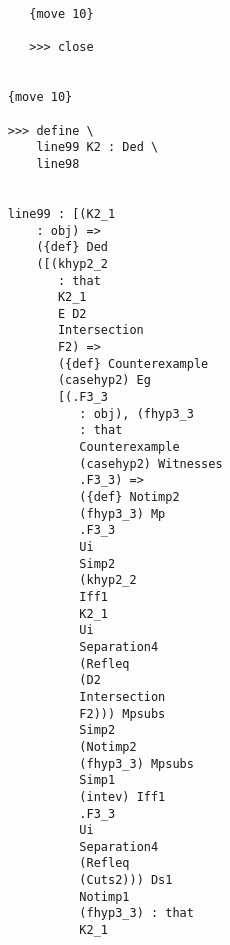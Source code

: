 \documentclass[12pt]{article}
\begin{document}
\begin{verbatim}
                                 {move 10}

                                 >>> close


                              {move 10}

                              >>> define \
                                  line99 K2 : Ded \
                                  line98


                              line99 : [(K2_1 
                                  : obj) => 
                                  ({def} Ded 
                                  ([(khyp2_2 
                                     : that 
                                     K2_1 
                                     E D2 
                                     Intersection 
                                     F2) => 
                                     ({def} Counterexample 
                                     (casehyp2) Eg 
                                     [(.F3_3 
                                        : obj), (fhyp3_3 
                                        : that 
                                        Counterexample 
                                        (casehyp2) Witnesses 
                                        .F3_3) => 
                                        ({def} Notimp2 
                                        (fhyp3_3) Mp 
                                        .F3_3 
                                        Ui 
                                        Simp2 
                                        (khyp2_2 
                                        Iff1 
                                        K2_1 
                                        Ui 
                                        Separation4 
                                        (Refleq 
                                        (D2 
                                        Intersection 
                                        F2))) Mpsubs 
                                        Simp2 
                                        (Notimp2 
                                        (fhyp3_3) Mpsubs 
                                        Simp1 
                                        (intev) Iff1 
                                        .F3_3 
                                        Ui 
                                        Separation4 
                                        (Refleq 
                                        (Cuts2))) Ds1 
                                        Notimp1 
                                        (fhyp3_3) : that 
                                        K2_1 

\end{verbatim}
\end{document}

